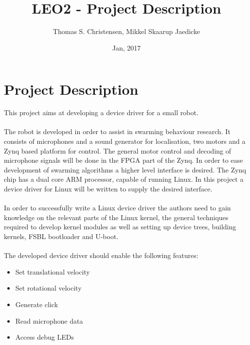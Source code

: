 \documentclass[11pt]{article}
\title{LEO2 - Project Description}
\author{Thomas S. Christensen, Mikkel Skaarup Jaedicke}
\date{Jan, 2017}
\begin{document}
\section*{Project Description} %
\label{sec:project_description}

This project aims at developing a device driver for a small robot.
\\~\\
The robot is developed in order to assist in swarming behaviour research.
It consists of microphones and a sound generator for localisation, two motors and a Zynq based platform for control.
The general motor control and decoding of microphone signals will be done in the FPGA part of the Zynq.
In order to ease development of swarming algorithms a higher level interface is desired. 
The Zynq chip has a dual core ARM processor, capable of running Linux.
In this project a device driver for Linux will be written to supply the desired interface.
\\~\\
In order to successfully write a Linux device driver the authors need to gain knowledge on the relevant parts of the Linux kernel, the general techniques required to develop kernel modules as well as setting up device trees, building kernels, FSBL bootloader and U-boot.
\\~\\
The developed device driver should enable the following features:
\begin{itemize}
	\item Set translational velocity
	\item Set rotational velocity
	\item Generate click
	\item Read microphone data
	\item Access debug LEDs 
\end{itemize}
\end{document}
